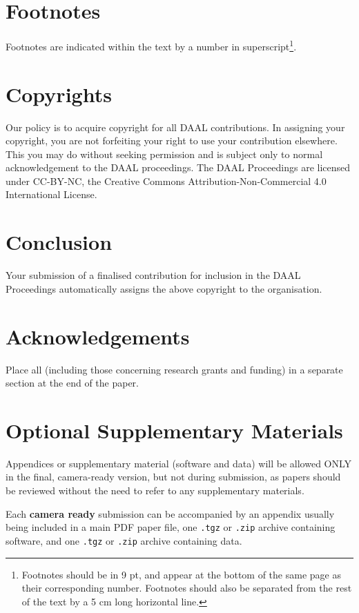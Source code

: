 \documentclass[10pt, a4paper]{article}
\begin{document}
\section{Footnotes}

Footnotes are indicated within the text by a number in superscript\footnote{Footnotes should be in  9 pt, and appear at the bottom of the same page as their corresponding number. Footnotes should also be separated from the rest of the text by a 5 cm long horizontal line.}.

\section{Copyrights}

Our policy is to acquire copyright for all DAAL contributions. In assigning your copyright, you are not forfeiting your right to use your contribution elsewhere. This you may do without seeking permission and is subject only to normal acknowledgement to the DAAL proceedings. The DAAL Proceedings are licensed under CC-BY-NC, the Creative Commons Attribution-Non-Commercial 4.0 International License.


\section{Conclusion}

Your submission of a finalised contribution for inclusion in the DAAL Proceedings automatically assigns the above copyright to the organisation.

\section{Acknowledgements}

Place all (including those concerning research grants and funding) in a separate section at the end of the paper.

\section{Optional Supplementary Materials}

Appendices or supplementary material (software and data) will be allowed ONLY in the final, camera-ready version, but not during submission, as papers should be reviewed without the need to refer to any supplementary
materials.

Each \textbf{camera ready} submission can be accompanied by an appendix usually being included in a main PDF paper file, one \texttt{.tgz} or \texttt{.zip} archive containing software, and one \texttt{.tgz} or \texttt{.zip} archive containing data.
\end{document}
